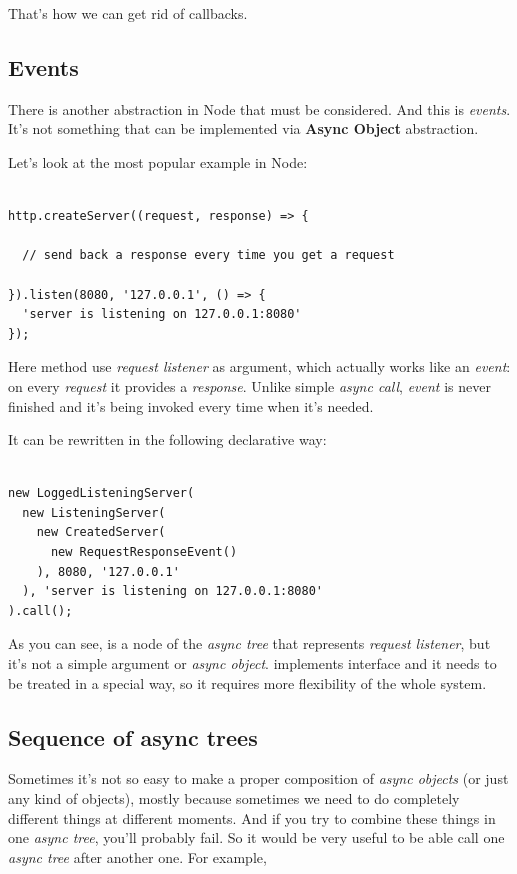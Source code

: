\documentclass{article}
\newcommand{\cit}[1]{{\fontfamily{qcr}\selectfont{\textit{\textcolor{superdarkgray}{#1}}}}}
\begin{document}
That's how we can get rid of callbacks.

\subsection{Events}

There is another abstraction in Node that must be considered. And this is \textit{events}. It's not something that can be implemented via \textbf{Async Object} abstraction.

Let's look at the most popular example in Node:

\begin{lstlisting}

http.createServer((request, response) => {

  // send back a response every time you get a request

}).listen(8080, '127.0.0.1', () => {
  'server is listening on 127.0.0.1:8080'
});

\end{lstlisting}

Here method \cit{createServer} use \textit{request listener} as argument, which actually works like an \textit{event}: on every \textit{request} it provides a  \textit{response}. Unlike simple \textit{async call}, \textit{event} is never finished and it's being invoked every time when it's needed.

It can be rewritten in the following declarative way:

\begin{lstlisting}

new LoggedListeningServer(
  new ListeningServer(
    new CreatedServer(
      new RequestResponseEvent()
    ), 8080, '127.0.0.1'
  ), 'server is listening on 127.0.0.1:8080'
).call();

\end{lstlisting}

As you can see, \cit{RequestResponseEvent} is a node of the \textit{async tree} that represents \textit{request listener}, but it's not a simple argument or \textit{async object}. \cit{RequestResponseEvent} implements \cit{Event} interface and it needs to be treated in a special way, so it requires more flexibility of the whole system.

\subsection{Sequence of async trees}

Sometimes it's not so easy to make a proper composition of \textit{async objects} (or just any kind of objects), mostly because sometimes we need to do completely different things at different moments. And if you try to combine these things in one \textit{async tree}, you'll probably fail. So it would be very useful to be able call one \textit{async tree} after another one. For example,
\end{document}
